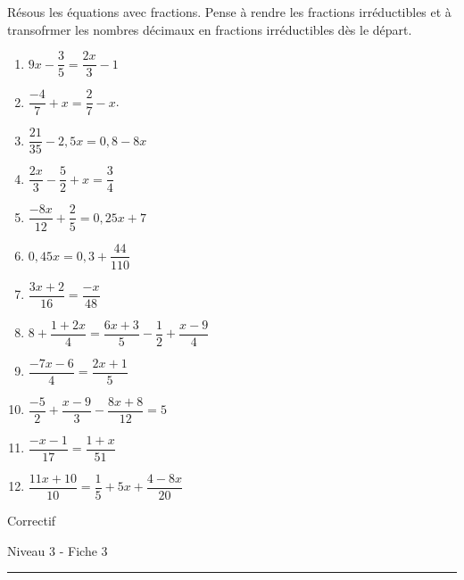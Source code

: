\documentclass[12pt,parskip=half-, twoside=semi]{scrartcl}
\begin{document}
\begin{exercise}
  Résous les équations avec fractions. Pense à rendre les fractions irréductibles et à transofrmer les nombres décimaux en fractions irréductibles dès le départ.
  \begin{enumerate}[itemsep=0.4cm]    
      \item $9 x-\dfrac{3}{5}=\dfrac{2 x}{3}-1$
      \item $\dfrac{-4}{7}+x=\dfrac{2}{7}-x$.
      \item $\dfrac{21}{35}-2,5 x=0,8-8 x$
      \item $\dfrac{2 x}{3}-\dfrac{5}{2}+x=\dfrac{3}{4}$
      \item $\dfrac{-8 x}{12}+\dfrac{2}{5}=0,25 x+7$
      \item $0,45 x=0,3+\dfrac{44}{110}$
      \item $\dfrac{3 x+2}{16}=\dfrac{-x}{48}$
      \item $8+\dfrac{1+2 x}{4}=\dfrac{6 x+3}{5}-\dfrac{1}{2}+\dfrac{x-9}{4}$
      \item \( \dfrac{-7x-6}{4} = \dfrac{2x+1}{5} \)
      \item \( \dfrac{-5}{2} + \dfrac{x-9}{3} - \dfrac{8x+8}{12} = 5 \)
      \item \( \dfrac{-x-1}{17} = \dfrac{1+x}{51} \)
      \item \( \dfrac{11x+10}{10} = \dfrac{1}{5} + 5x + \dfrac{4-8x}{20} \) 
  \end{enumerate}
\end{exercise}


\newpage


\begin{center}
  \bfseries
  \begin{Huge}
    Correctif
  \end{Huge}
  \smallbreak
  \begin{large}
    Niveau 3  - Fiche 3
  \end{large}
  \smallbreak
  \rule[10pt]{.5\linewidth}{1 pt}
\end{center}
\setcounter{exercise}{0}
\end{document}
